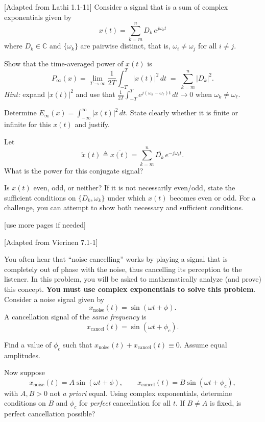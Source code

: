 \documentclass{ee102_pset}
\author{\rule{3cm}{0.4pt}} %
\begin{document}

[Adapted from Lathi 1.1-11] Consider a signal that is a sum of complex exponentials given by
\[
x(t)=\sum_{k=m}^{n} D_k\,e^{j\omega_k t}\!
\]
where $D_k\in\mathbb{C}$ and $\{\omega_k\}$ are pairwise distinct, that is, $\omega_i \neq \omega_j$ for all $i \neq j$.

\problempart{[5 points]} Show that the time-averaged power of $x(t)$ is
  \[
  P_\infty(x)=\lim_{T\to\infty}\frac{1}{2T}\int_{-T}^{T}|x(t)|^2\,dt
  \;=\;\sum_{k=m}^{n}|D_k|^2.
  \]
  \emph{Hint:} expand $|x(t)|^2$ and use that $\frac{1}{2T}\!\int_{-T}^{T}\!e^{j(\omega_k-\omega_\ell)t}\,dt\to 0$ when $\omega_k\neq\omega_\ell$.

\problempart{[5 points]} Determine $E_\infty(x)=\int_{-\infty}^{\infty}|x(t)|^2\,dt$. State clearly whether it is finite or infinite for this $x(t)$ and justify.

\problempart{[5 points]} Let
  \[
  \tilde{x}(t)\triangleq \overline{x(t)}=\sum_{k=m}^{n}\overline{D_k}\,e^{-j\omega_k t}.
  \] What is the power for this conjugate signal?

\problempart{[5 points]} Is $x(t)$ even, odd, or neither? If it is not necessarily even/odd, state the sufficient conditions on $\{D_k,\omega_k\}$ under which $x(t)$ becomes even or odd. For a challenge, you can attempt to show both necessary and sufficient conditions.
\vspace*{\fill}
\begin{center}
[use more pages if needed]
\end{center}

 [Adapted from Vierinen 7.1-1]

You often hear that ``noise cancelling'' works by playing a signal that is completely out of phase with the noise, thus cancelling its perception to the listener. In this problem, you will be asked to mathematically analyze (and prove) this concept. \textbf{You must use complex exponentials to solve this problem}. Consider a noise signal given by
\[
x_{\text{noise}}(t)=\sin(\omega t+\phi).
\]
A cancellation signal of the \emph{same frequency} is
\[
x_{\text{cancel}}(t)=\sin(\omega t+\phi_c).
\]

\problempart{\textbf{[10 points]}}
Find a value of $\phi_c$ such that $x_{\text{noise}}(t)+x_{\text{cancel}}(t)\equiv 0$. Assume equal amplitudes.

\medskip

\problempart{\textbf{[15 points]}} Now suppose
\[
x_{\text{noise}}(t)=A\sin(\omega t+\phi),\qquad
x_{\text{cancel}}(t)=B\sin(\omega t+\phi_c),
\]
with $A,B>0$ not \emph{a priori} equal. Using complex exponentials, determine conditions on $B$ and $\phi_c$ for \emph{perfect} cancellation for all $t$. If $B\neq A$ is fixed, is perfect cancellation possible?
\end{document}
